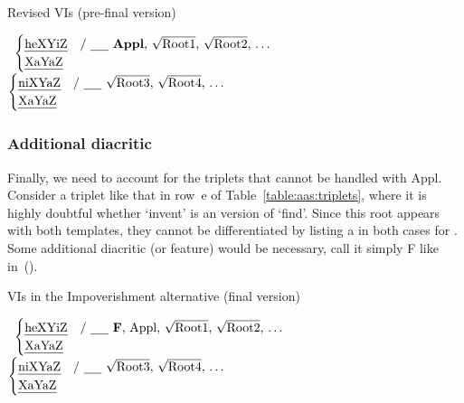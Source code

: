 \begin{exe}
\begin{xlist}
\begin{exe}
\begin{exe}
\begin{xlist}
\begin{exe}
\begin{exe}
\begin{exe}
\begin{exe}
\begin{exe}
\begin{xlist}
\begin{exe}
\begin{exe}
\begin{xlist}
\begin{exe}
\begin{xlist}
 \begin{exe}
 \ex  Revised VIs (pre-final version) 
 \begin{xlist} 
 	\ex  {\vds} \lra~$\begin{cases} 
		\text{\thif} & \text{/ \trace~\textbf{Appl}, \root{Root1}, \root{Root2}, \dots}\\
		\text{\tkal} & \\
		\end{cases}$
 	\ex  {\vzs} \lra~$\begin{cases} 
		\text{\tnif} & \text{/ \trace~\root{Root3}, \root{Root4}, \dots}\\
		\text{\tkal} & \\
		\end{cases}$
 \z
\z 

		\subsubsection{Additional diacritic}
Finally, we need to account for the triplets that cannot be handled with Appl. Consider a triplet like that in row~e of Table~\ref{table:aas:triplets}, where it is highly doubtful whether `invent' is an  version of `find'. Since this root appears with both templates, they cannot be differentiated by listing a  in both cases for {\vds}. Some additional diacritic (or feature) would be necessary, call it simply F like in~(\nextx).

 \begin{exe}
 \ex  \label{aas:ex:jim-vis}VIs in the Impoverishment alternative (final version) 
 \begin{xlist} 
 	\ex  {\vds} \lra~$\begin{cases} 
		\text{\thif} & \text{/ \trace~\textbf{F}, Appl, \root{Root1}, \root{Root2}, \dots}\\
		\text{\tkal} & \\
		\end{cases}$
 	\ex  {\vzs} \lra~$\begin{cases} 
		\text{\tnif} & \text{/ \trace~\root{Root3}, \root{Root4}, \dots}\\
		\text{\tkal} & \\
		\end{cases}$
 \z
\z 

	

\end{xlist}
\end{exe}
\end{xlist}
\end{exe}
\end{xlist}
\end{exe}
\end{xlist}
\end{exe}
\end{exe}
\end{xlist}
\end{exe}
\end{exe}
\end{exe}
\end{exe}
\end{exe}
\end{xlist}
\end{exe}
\end{exe}
\end{xlist}
\end{exe}
